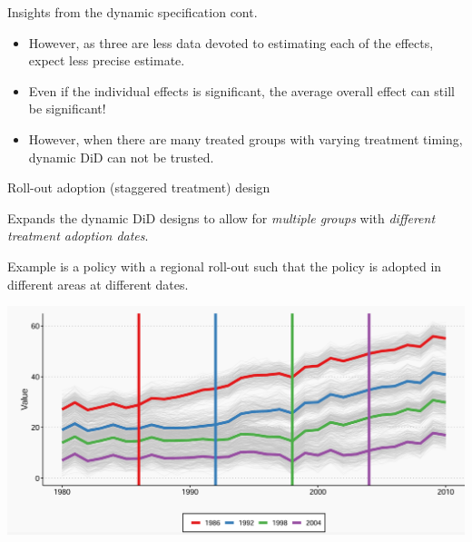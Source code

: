 \documentclass[notes,11pt, aspectratio=169]{beamer}
\newenvironment{wideitemize}{\itemize\addtolength{\itemsep}{10pt}}{\enditemize}
\begin{document}
\begin{frame}{Insights from the dynamic specification cont.} 
\begin{itemize}
\item However, as three are less data devoted to estimating each of the effects, expect less precise estimate.
\item Even if the individual effects is significant, the average overall effect can still be significant!  
\item However, when there are many treated groups with varying treatment timing, dynamic DiD can not be trusted.

\end{itemize}
\end{frame}

\begin{frame}{Roll-out adoption (staggered treatment) design}
      \begin{wideitemize}
          \item Expands the dynamic DiD designs to allow for \textit{multiple groups} with \textit{different treatment adoption dates}. \item Example is a policy with a regional roll-out such that the policy is adopted in different areas at different dates.
\vspace{1cm}
    \begin{center}
        \includegraphics[width=0.6\linewidth]{24_DiDLecture/24_DiDLecture_StaggeredRollout.png}
    \end{center}
          
      \end{wideitemize}
\end{frame}
\end{document}

